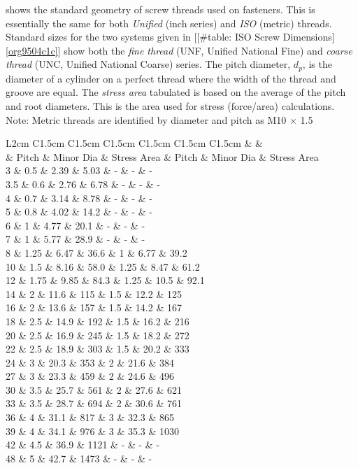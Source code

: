 \documentclass[a4paper,openany,12pt]{book}
\begin{document}
{{shows the standard geometry of screw threads used on fasteners. This is
essentially the same for both \emph{Unified} (inch series) and \emph{ISO} (metric)
threads. Standard sizes for the two systems given in
[[\#table: ISO Screw Dimensions]\ref{org9504c1c}] show
both the \emph{fine thread} (UNF, Unified National Fine) and \emph{coarse thread}
(UNC, Unified National Coarse) series. The pitch diameter, \(d_p\), is the
diameter of a cylinder on a perfect thread where the width of the thread
and groove are equal. The \emph{stress area} tabulated is based on the
average of the pitch and root diameters. This is the area used for
stress (force/area) calculations. Note: Metric threads are identified by
diameter and pitch as M10 \(\times\) 1.5


 L2cm C1.5cm C1.5cm C1.5cm C1.5cm C1.5cm C1.5cm \& \&\\
\& Pitch \& Minor Dia \& Stress Area \& Pitch \& Minor Dia \& Stress Area\\
3 \& 0.5 \& 2.39 \& 5.03 \& - \& - \& -\\
3.5 \& 0.6 \& 2.76 \& 6.78 \& - \& - \& -\\
4 \& 0.7 \& 3.14 \& 8.78 \& - \& - \& -\\
5 \& 0.8 \& 4.02 \& 14.2 \& - \& - \& -\\
6 \& 1 \& 4.77 \& 20.1 \& - \& - \& -\\
7 \& 1 \& 5.77 \& 28.9 \& - \& - \& -\\
8 \& 1.25 \& 6.47 \& 36.6 \& 1 \& 6.77 \& 39.2\\
10 \& 1.5 \& 8.16 \& 58.0 \& 1.25 \& 8.47 \& 61.2\\
12 \& 1.75 \& 9.85 \& 84.3 \& 1.25 \& 10.5 \& 92.1\\
14 \& 2 \& 11.6 \& 115 \& 1.5 \& 12.2 \& 125\\
16 \& 2 \& 13.6 \& 157 \& 1.5 \& 14.2 \& 167\\
18 \& 2.5 \& 14.9 \& 192 \& 1.5 \& 16.2 \& 216\\
20 \& 2.5 \& 16.9 \& 245 \& 1.5 \& 18.2 \& 272\\
22 \& 2.5 \& 18.9 \& 303 \& 1.5 \& 20.2 \& 333\\
24 \& 3 \& 20.3 \& 353 \& 2 \& 21.6 \& 384\\
27 \& 3 \& 23.3 \& 459 \& 2 \& 24.6 \& 496\\
30 \& 3.5 \& 25.7 \& 561 \& 2 \& 27.6 \& 621\\
33 \& 3.5 \& 28.7 \& 694 \& 2 \& 30.6 \& 761\\
36 \& 4 \& 31.1 \& 817 \& 3 \& 32.3 \& 865\\
39 \& 4 \& 34.1 \& 976 \& 3 \& 35.3 \& 1030\\
42 \& 4.5 \& 36.9 \& 1121 \& - \& - \& -\\
48 \& 5 \& 42.7 \& 1473 \& - \& - \& -\\

}}
\end{document}
